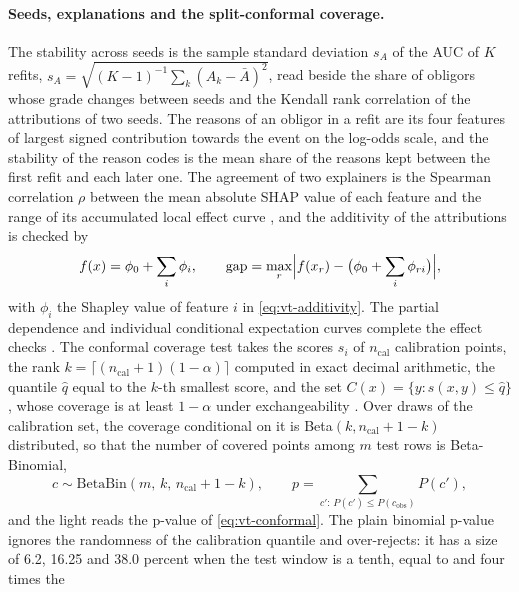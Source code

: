 \paragraph{Seeds, explanations and the split-conformal coverage.} The stability across seeds is the sample standard deviation $s_A$ of the AUC of $K$ refits, $s_A=\sqrt{(K-1)^{-1}\sum_k(A_k-\bar A)^2}$, read beside the
share of obligors whose grade changes between seeds and the Kendall rank correlation of the attributions of two seeds. The reasons of an obligor in a refit are its four features of largest signed contribution towards the
event on the log-odds scale, and the stability of the reason codes is the mean share of the reasons kept between the first refit and each later one. The agreement of two explainers is the Spearman correlation $\rho$ between the
mean absolute SHAP value of each feature \citep{credit-scoring:lundberg2017,credit-scoring:lundberg2020} and the range of its accumulated local effect curve \citep{validation-tests:apley2020}, and the additivity of the attributions is checked
by
\begin{equation}
  f(x)=\phi_0+\sum_i\phi_i,\qquad \text{gap}=\max_r\Bigl|f(x_r)-\bigl(\phi_0+\sum_i\phi_{ri}\bigr)\Bigr|,
  \label{eq:vt-additivity}
\end{equation}
with $\phi_i$ the Shapley value of feature $i$ in \cref{eq:vt-additivity}. The partial dependence and individual conditional expectation curves complete the effect checks \citep{validation-tests:friedman2001,validation-tests:goldstein2015}. The conformal coverage test
takes the scores $s_i$ of $n_{\mathrm{cal}}$ calibration points, the rank $k=\lceil(n_{\mathrm{cal}}+1)(1-\alpha)\rceil$ computed in exact decimal arithmetic, the quantile $\hat q$ equal to the $k$-th smallest score, and the set
$C(x)=\{y:s(x,y)\le\hat q\}$, whose coverage is at least $1-\alpha$ under exchangeability \citep{validation-tests:angelopoulos2021,validation-tests:vovk2022}. Over draws of the calibration set, the coverage conditional on it is Beta$(k,n_{\mathrm{cal}}+1-k)$ distributed, so that the number of covered
points among $m$ test rows is Beta-Binomial,
\begin{equation}
  c\sim\mathrm{BetaBin}(m,\,k,\,n_{\mathrm{cal}}+1-k),\qquad p=\sum_{c':\,P(c')\le P(c_{\mathrm{obs}})}P(c'),
  \label{eq:vt-conformal}
\end{equation}
and the light reads the p-value of \cref{eq:vt-conformal}. The plain binomial p-value ignores the randomness of the calibration quantile and over-rejects: it has a size of 6.2, 16.25 and 38.0 percent when the test window is a tenth, equal to and four times the
